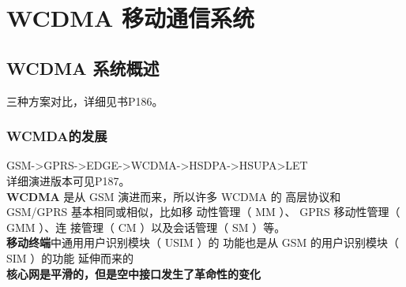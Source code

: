 \chapter{WCDMA 移动通信系统}
\section{WCDMA 系统概述}
三种方案对比，详细见书P186。
\subsection{WCMDA的发展}
GSM->GPRS->EDGE->WCDMA->HSDPA->HSUPA>LET\\
详细演进版本可见P187。\\
\textbf{WCDMA }是从 GSM 演进而来，所以许多 WCDMA 的
高层协议和 GSM/GPRS 基本相同或相似，比如移
动性管理（ MM ）、 GPRS 移动性管理（ GMM ）、连
接管理（ CM ）以及会话管理（ SM ）等。\\
\textbf{移动终端}中通用用户识别模块（ USIM ）的
功能也是从 GSM 的用户识别模块（ SIM ）的功能
延伸而来的\\
\textbf{核心网是平滑的，但是空中接口发生了革命性的变化}
